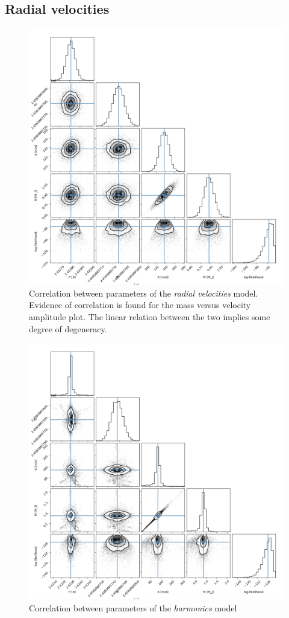 \documentclass{aa}
\begin{document}

\subsection{Radial velocities}
\label{sect:app_C_RV}




\begin{figure}[h]
    \centering
      \includegraphics[scale=0.25, angle=0]{pictures/corner_RV.png}
      \caption{Correlation between parameters of the \textit{radial velocities} model. Evidence of correlation is found for the mass versus velocity amplitude plot. The linear relation between the two implies some degree of degeneracy.}
     \label{fig: cpRV}
\end{figure}

\begin{figure}[h]
    \centering
      \includegraphics[scale=0.25, angle=0]{pictures/corner_RV_harmonics.png}
      \caption{Correlation between parameters of the \textit{harmonics} model}
     \label{fig: cpRV2}
\end{figure}
\end{document}
